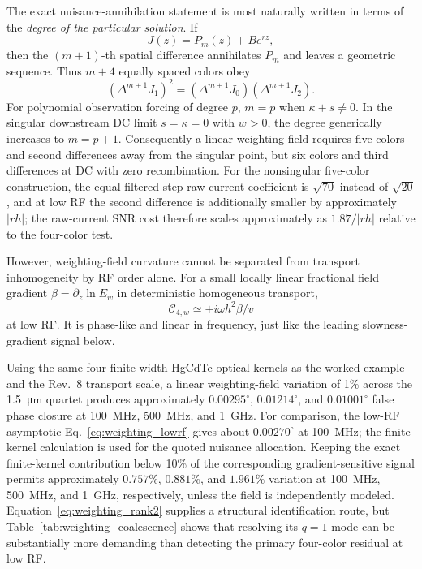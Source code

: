 \documentclass[11pt]{article}
\begin{document}
The exact nuisance-annihilation statement is most naturally written in terms of the \emph{degree of the particular solution}. If
\begin{equation}
J(z)=P_m(z)+Be^{rz},
\end{equation}
then the $(m+1)$-th spatial difference annihilates $P_m$ and leaves a geometric sequence. Thus $m+4$ equally spaced colors obey
\begin{equation}
\boxed{(\Delta^{m+1}J_1)^2=(\Delta^{m+1}J_0)(\Delta^{m+1}J_2).}
\label{eq:poly_annihilation}
\end{equation}
For polynomial observation forcing of degree $p$, $m=p$ when $\kappa+s\neq0$. In the singular downstream DC limit $s=\kappa=0$ with $w>0$, the degree generically increases to $m=p+1$. Consequently a linear weighting field requires five colors and second differences away from the singular point, but six colors and third differences at DC with zero recombination. For the nonsingular five-color construction, the equal-filtered-step raw-current coefficient is $\sqrt{70}$ instead of $\sqrt{20}$, and at low RF the second difference is additionally smaller by approximately $|rh|$; the raw-current SNR cost therefore scales approximately as $1.87/|rh|$ relative to the four-color test.

However, weighting-field curvature cannot be separated from transport inhomogeneity by RF order alone. For a small locally linear fractional field gradient $\beta=\partial_z\ln E_w$ in deterministic homogeneous transport,
\begin{equation}
\boxed{\mathcal C_{4,w}\simeq+i\omega h^2\beta/v}
\label{eq:weighting_lowrf}
\end{equation}
at low RF. It is phase-like and linear in frequency, just like the leading slowness-gradient signal below.

Using the same four finite-width HgCdTe optical kernels as the worked example and the Rev.~8 transport scale, a linear weighting-field variation of 1\% across the \SI{1.5}{\micro\meter} quartet produces approximately $0.00295^\circ$, $0.01214^\circ$, and $0.01001^\circ$ false phase closure at \SI{100}{MHz}, \SI{500}{MHz}, and \SI{1}{GHz}. For comparison, the low-RF asymptotic Eq.~\eqref{eq:weighting_lowrf} gives about $0.00270^\circ$ at \SI{100}{MHz}; the finite-kernel calculation is used for the quoted nuisance allocation. Keeping the exact finite-kernel contribution below 10\% of the corresponding gradient-sensitive signal permits approximately $0.757\%$, $0.881\%$, and $1.961\%$ variation at \SI{100}{MHz}, \SI{500}{MHz}, and \SI{1}{GHz}, respectively, unless the field is independently modeled. Equation~\eqref{eq:weighting_rank2} supplies a structural identification route, but Table~\ref{tab:weighting_coalescence} shows that resolving its $q=1$ mode can be substantially more demanding than detecting the primary four-color residual at low RF.
\end{document}
